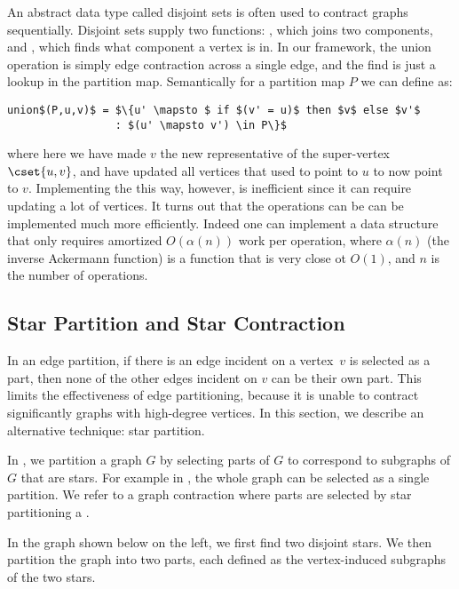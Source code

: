 {\begin{remark}
  An abstract data type called disjoint sets is often used to contract
  graphs sequentially.  Disjoint sets supply two functions:
  , which joins two components, and , which
  finds what component a vertex is in.  In our framework, the union
  operation is simply edge contraction across a single edge, and the
  find is just a lookup in the partition map.  Semantically for a
  partition map $P$ we can define  as:

\begin{lstlisting}[numbers=none]
  union$(P,u,v)$ = $\{u' \mapsto $ if $(v' = u)$ then $v$ else $v'$ 
                 : $(u' \mapsto v') \in P\}$
\end{lstlisting}
where here we have made $v$ the new representative of the super-vertex
$\cset{u,v}$, and have updated all vertices that used to point to $u$
to now point to $v$.
Implementing the  this way, however, is inefficient since
it can require updating a lot of vertices.  It turns out that the
operations can be can be implemented much more efficiently.  Indeed
one can implement a data structure that only requires amortized
$O(\alpha(n))$ work per operation, where $\alpha(n)$ (the inverse
Ackermann function) is a function that is very close ot $O(1)$, and
$n$ is the number of operations.
\end{remark}


\subsection{Star Partition and Star Contraction}
\label{sec:gc::star-partitioning}

In an edge partition, if there is an edge incident on a vertex~$v$ is
selected as a part, then none of the other edges incident on $v$ can be their own
part. This limits the effectiveness of edge partitioning, because it
is unable to contract significantly graphs with high-degree vertices.
%
In this section, we describe an alternative technique: star
partition.  

In , we partition a graph $G$ by selecting
parts of $G$ to correspond to subgraphs of $G$ that are stars.  For
example in , the whole graph can be selected as a
single partition.  We refer to a graph contraction where parts
are selected by star partitioning a .

\begin{example}
  In the graph shown below on the left, we first find two disjoint stars. We
  then partition the graph into two parts, each defined as the
  vertex-induced subgraphs of the two stars.


\end{example}}
